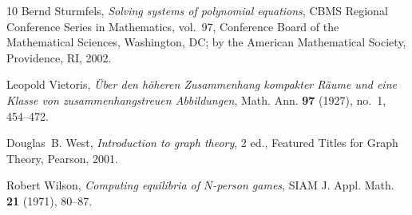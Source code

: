 \documentclass[a4paper,11pt,reqno,english]{amsart}
\theoremstyle{plain}
\theoremstyle{definition}
\begin{document}
\begin{thebibliography}{10}
Bernd Sturmfels, \emph{Solving systems of polynomial equations}, CBMS Regional
  Conference Series in Mathematics, vol.~97, Conference Board of the
  Mathematical Sciences, Washington, DC; by the American Mathematical Society,
  Providence, RI, 2002.

Leopold Vietoris, \emph{\"{U}ber den h\"{o}heren {Z}usammenhang kompakter
  {R}\"{a}ume und eine {K}lasse von zusammenhangstreuen {A}bbildungen}, Math.
  Ann. \textbf{97} (1927), no.~1, 454--472.

Douglas~B. West, \emph{Introduction to graph theory}, 2 ed., Featured Titles
  for Graph Theory, Pearson, 2001.

Robert Wilson, \emph{Computing equilibria of {$N$}-person games}, SIAM J. Appl.
  Math. \textbf{21} (1971), 80--87.

\end{thebibliography}
\end{document}
